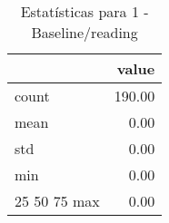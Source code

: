 \begin{table}[htbp]
\caption{Estatísticas para 1 - Baseline/reading}
\label{tab:1_-_baseline_reading_summary}
\begin{tabular}{lr}
\toprule
 & value \\
\midrule
count & 190.00 \\
mean & 0.00 \\
std & 0.00 \\
min & 0.00 \\
25%
50%
75%
max & 0.00 \\
\bottomrule
\end{tabular}
\end{table}
